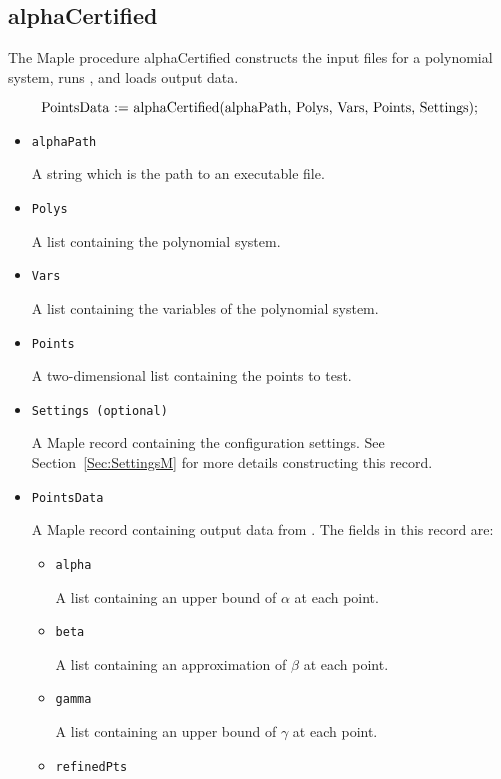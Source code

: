\documentclass[11pt]{report}
\begin{document}
\subsection{alphaCertified}\label{Sec:alphaM}

The Maple procedure alphaCertified constructs the input files
for a polynomial system, runs \alphaCertified, and loads output data.

\[
\hbox{PointsData := alphaCertified(alphaPath, Polys, Vars, Points, Settings);}
\]

\begin{itemize}

\item {\tt alphaPath}

A string which is the path to an \alphaCertifiedS executable file.

\item {\tt Polys}

A list containing the polynomial system.

\item {\tt Vars}

A list containing the variables of the polynomial system.

\item {\tt Points}

A two-dimensional list containing the points to test.

\item {\tt Settings (optional)}

A Maple record containing the configuration settings.
See Section~\ref{Sec:SettingsM} for more details constructing
this record.

\item {\tt PointsData}

A Maple record containing output data from \alphaCertified.
The fields in this record are:
\begin{itemize}
 \item {\tt alpha}

A list containing an upper bound of $\alpha$ at each point.

 \item {\tt beta}

A list containing an approximation of $\beta$ at each point.

 \item {\tt gamma}

A list containing an upper bound of $\gamma$ at each point.

 \item {\tt refinedPts}


\end{itemize}
\end{itemize}
\end{document}
